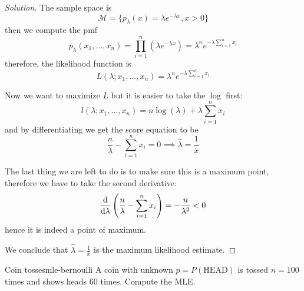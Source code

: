 \documentclass[12pt]{extarticle}
\begin{document}
\begin{proof}[Solution]
	The sample space is
	\begin{equation}
		\mathcal{M} = \{ p_\lambda(x) = \lambda e^{-\lambda x}, x > 0 \}
	\end{equation}
	then we compute the pmf
	\begin{equation}
		p_\lambda (x_1, \dots, x_n) = \prod_{i = 1}^n (\lambda e^{-\lambda x}) = \lambda^n e^{-\lambda \sum_{i = 1}^n x_i}
	\end{equation}
	therefore, the likelihood function is
	\begin{equation}
		L(\lambda; x_1, \dots, x_n) = \lambda^n e^{-\lambda \sum_{i = 1}^n x_i}
	\end{equation}

	Now we want to maximize $L$ but it is easier to take the $\log$ first:
	\begin{equation}
		l(\lambda; x_1, \dots, x_n) = n\log(\lambda) + \lambda \sum_{i = 1}^n x_i
	\end{equation}
	and by differentiating we get the score equation to be
	\begin{equation}
		\frac{n}{\lambda} - \sum_{i = 1}^{n} x_i = 0
		\implies \hat \lambda = \frac{1}{\bar{x}}
	\end{equation}

	The last thing we are left to do is to make sure this is a maximum point, therefore we have to take the second derivative:
	\begin{equation}
		\dv{}{\lambda} \left( \frac{n}{\lambda} - \sum_{i = 1}^{n} x_i \right) = -\frac{n}{\lambda^2} < 0
	\end{equation}
	hence it is indeed a point of maximum.

	We conclude that $\hat \lambda = \frac{1}{\bar{x}}$ is the maximum likelihood estimate.
\end{proof}


\begin{example}{Coin tosses}{mle-bernoulli}
	A coin with unknown $p = P(\text{HEAD})$ is tossed $n = 100$ times and shows heads $60$ times.
	Compute the MLE.
\end{example}
\end{document}
